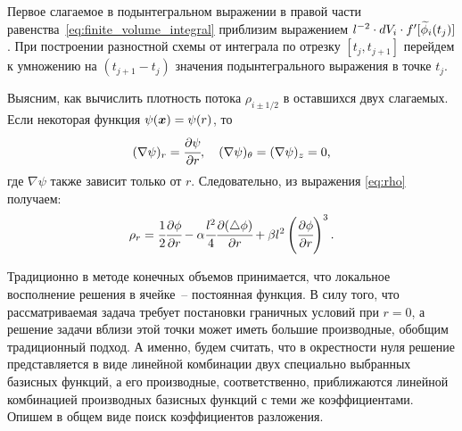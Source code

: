 Первое слагаемое в подынтегральном выражении в правой части равенства~\eqref{eq:finite_volume_integral} приблизим выражением $l^{-2} \cdot dV_i \cdot f'[{\widetilde{\phi}}_i(t_j)]$. При построении разностной схемы от интеграла по отрезку $[t_j, t_{j + 1}]$ перейдем к умножению на $(t_{j + 1} - t_j)$ значения подынтегрального выражения в точке $t_j$.

Выясним, как вычислить плотность потока $\rho_{i \pm 1/2}$ в оставшихся двух слагаемых. Если некоторая функция $\psi({\boldsymbol{x}}) = \psi(r)$, то
$$(\nabla \psi)_r = \cfrac{\partial \psi}{\partial r}, \quad (\nabla \psi)_\theta = (\nabla \psi)_z = 0 {\text{,}}$$
где $\nabla \psi$ также зависит только от $r$. Следовательно, из выражения \eqref{eq:rho} получаем:
\begin{equation}
	\rho_r = \cfrac{1}{2} \cfrac{\partial \phi}{\partial r} - \alpha \cfrac{l^2}{4} \cfrac{\partial (\triangle \phi)}{\partial r} + \beta l^2 \left( \cfrac{\partial \phi}{\partial r} \right)^3 {\text{.}}
	\label{eq:finite_volumes_density}
\end{equation}

Традиционно в методе конечных объемов принимается, что локальное восполнение решения в ячейке~-- постоянная функция. В силу того, что рассматриваемая задача требует постановки граничных условий при $r = 0$, а решение задачи вблизи этой точки может иметь большие производные, обобщим традиционный подход. А именно, будем считать, что в окрестности нуля решение представляется в виде линейной комбинации двух специально выбранных базисных функций, а его производные, соответственно, приближаются линейной комбинацией производных базисных функций с теми же коэффициентами. Опишем в общем виде поиск коэффициентов разложения.


